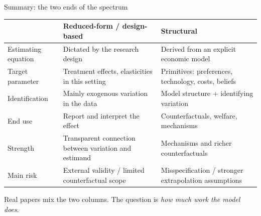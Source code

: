 \documentclass[aspectratio=169,11pt]{beamer}
\begin{document}
\begin{frame}{Summary: the two ends of the spectrum}

\small
\setlength{\tabcolsep}{4pt}
\renewcommand{\arraystretch}{1.05}

\begin{tabular}{L{0.20\textwidth} L{0.37\textwidth} L{0.37\textwidth}}
\toprule
&
\textbf{Reduced-form / design-based}
&
\textbf{Structural}
\\
\midrule

Estimating equation
&
Dictated by the research design
&
Derived from an explicit economic model
\\[0.4em]

Target parameter
&
Treatment effects, elasticities in this setting
&
Primitives: preferences, technology, costs, beliefs
\\[0.4em]

Identification
&
Mainly exogenous variation in the data
&
Model structure + identifying variation
\\[0.4em]

End use
&
Report and interpret the effect
&
Counterfactuals, welfare, mechanisms
\\[0.4em]

Strength
&
Transparent connection between variation and estimand
&
Mechanisms and richer counterfactuals
\\[0.4em]

Main risk
&
External validity / limited counterfactual scope
&
Misspecification / stronger extrapolation assumptions
\\
\bottomrule
\end{tabular}

\vspace{0.4em}

\begin{center}
Real papers mix the two columns. The question is \emph{how much work the model does}.
\end{center}

\end{frame}
\end{document}
